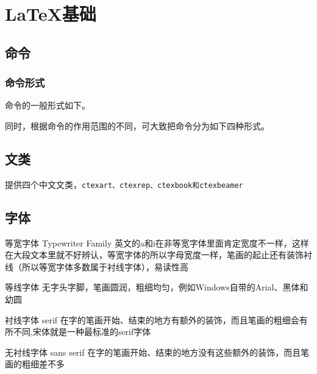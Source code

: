 {\let\clearpage\relax \chapter{\LaTeX 基础}}

\section{命令}


\subsection{命令形式}

命令的一般形式如下。

\begin{latex}{}
\end{latex}

同时，根据命令的作用范围的不同，可大致把命令分为如下四种形式。

\section{文类}

\CTeX 提供四个中文文类，\texttt{ctexart、ctexrep、ctexbook和ctexbeamer}

\section{字体}

\begin{asparadesc}
	\item[等宽字体] Typewriter Family 英文的a和i在非等宽字体里面肯定宽度不一样，这样在大段文本里就不好辨认，等宽字体的所以字母宽度一样，笔画的起止还有装饰衬线（所以等宽字体多数属于衬线字体），易读性高
	\item[等线字体] 无字头字脚，笔画圆润，粗细均匀，例如Windows自带的Arial、黑体和幼圆
	\item[衬线字体] serif 在字的笔画开始、结束的地方有额外的装饰，而且笔画的粗细会有所不同,宋体就是一种最标准的serif字体
	\item[无衬线字体] sans serif 在字的笔画开始、结束的地方没有这些额外的装饰，而且笔画的粗细差不多
\end{asparadesc}

